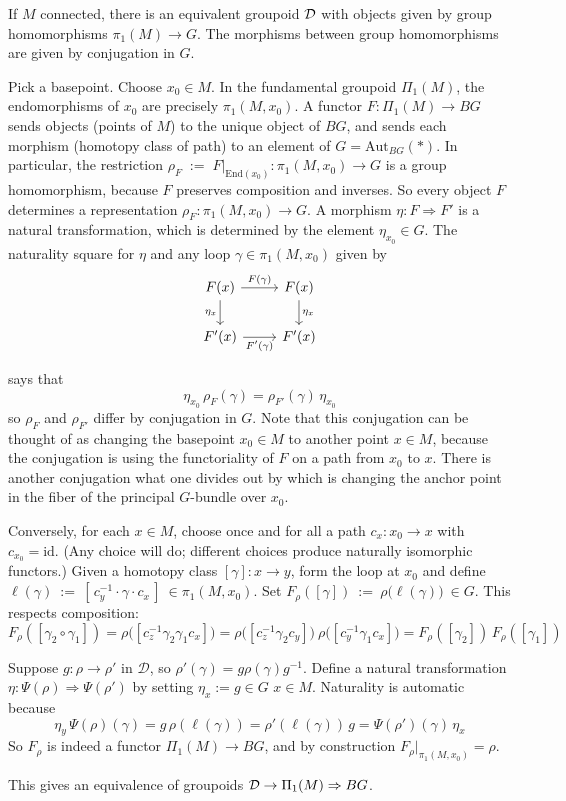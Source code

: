 \documentclass[12pt]{article}
\begin{document}
\begin{example}[Connected $M$]
    If $M$ connected, there is an equivalent groupoid ${\mathcal{D}}$ with objects given by group homomorphisms $\pi_1(M) \to G$. The morphisms between group homomorphisms are given by conjugation in $G$.

    Pick a basepoint. Choose $x_0\in M$. In the fundamental groupoid $\Pi_1(M)$, the endomorphisms of $x_0$ are precisely $\pi_1(M,x_0)$. A functor $F\colon\Pi_1(M)\to BG$ sends objects (points of $M$) to the unique object of $BG$, and sends each morphism (homotopy class of path) to an element of $G=\mathrm{Aut}_{BG}(*)$. In particular, the restriction $\rho_F \;:=\; F\big|_{\mathrm{End}(x_0)}\colon \pi_1(M,x_0)\longrightarrow G$
    is a group homomorphism, because $F$ preserves composition and inverses. So every object $F$ determines a representation $\rho_F\colon\pi_1(M,x_0)\to G$. A morphism $\eta\colon F\Rightarrow F'$ is a natural transformation, which is determined by the element $\eta_{x_0}\in G$. The naturality square for $\eta$ and any loop $\gamma\in \pi_1(M,x_0)$ given by \[
        \begin{tikzcd}
            F(x) \arrow[r,"F(\gamma)"] \arrow[d,"\eta_x"'] & F(x) \arrow[d,"\eta_x"] \\
            F'(x) \arrow[r,"F'(\gamma)"'] & F'(x)
        \end{tikzcd}
    \]

    says that
    \[\eta_{x_0} \, \rho_F(\gamma) = \rho_{F'}(\gamma)\, \eta_{x_0}\] so $\rho_F$ and $\rho_{F'}$ differ by conjugation in $G$. Note that this conjugation can be thought of as changing the basepoint $x_0 \in M$ to another point $x\in M$, because the conjugation is using the functoriality of $F$ on a path from $x_0$ to $x$. There is another conjugation what one divides out by which is changing the anchor point in the fiber of the principal $G$-bundle over $x_0$.

    Conversely, for each $x\in M$, choose once and for all a path $c_x:x_0\to x$ with $c_{x_0}=\mathrm{id}$. (Any choice will do; different choices produce naturally isomorphic functors.) Given a homotopy class $[\gamma]:x\to y$, form the loop at $x_0$ and define $\ell(\gamma)\ :=\ [\,c_y^{-1}\cdot \gamma \cdot c_x\,]\ \in \pi_1(M,x_0)$.
    Set
    $F_\rho([\gamma])\ :=\ \rho\big(\ell(\gamma)\big)\ \in G$.
    This respects composition:
    \[F_\rho([\gamma_2\circ\gamma_1])
        = \rho\!\big([c_z^{-1}\gamma_2\gamma_1 c_x]\big)
        = \rho\!\big([c_z^{-1}\gamma_2 c_y]\big)\ \rho\!\big([c_y^{-1}\gamma_1 c_x]\big)
        = F_\rho([\gamma_2])\,F_\rho([\gamma_1])\]

    Suppose $g:\rho\to\rho'$ in $\mathcal{D}$, so $\rho'(\gamma)=g \rho(\gamma) g^{-1}$.
    Define a natural transformation $\eta:\Psi(\rho)\Rightarrow \Psi(\rho')$ by setting
    $\eta_x := g \in G$ \quad {} $x\in M$.
    Naturality is automatic because
    \[\eta_y\,\Psi(\rho)(\gamma) = g\,\rho(\ell(\gamma)) = \rho'(\ell(\gamma))\,g = \Psi(\rho')(\gamma)\,\eta_x\] So $F_\rho$ is indeed a functor $\Pi_1(M)\to BG$, and by construction $F_\rho\big|_{\pi_1(M,x_0)}=\rho$.

    This gives an equivalence of groupoids ${\mathcal{D}}\to \Pi_1(M)\Rightarrow BG$.
\end{example}
\end{document}
